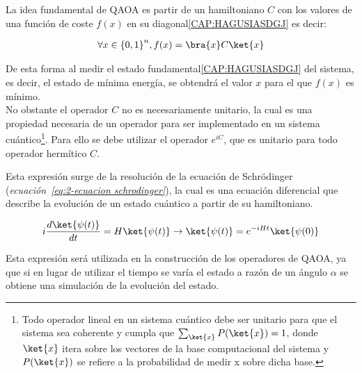 La idea fundamental de QAOA es partir de un hamiltoniano $C$ con los valores de una función de coste $f(x)$ en su diagonal\ref{CAP:HAGUSIASDGJ} es decir:

\begin{align}
  \forall{x \in {\{0, 1\}}^{n}}, f(x) = \bra{x}C\ket{x}
\end{align}

De esta forma al medir el estado fundamental\ref{CAP:HAGUSIASDGJ} del sistema, es decir, el estado de mínima energía, se obtendrá el valor $x$ para el que $f(x)$ es mínimo.
\\
No obstante el operador $C$ no es necesariamente unitario, la cual es una propiedad necesaria de un operador para ser implementado en un sistema cuántico\footnote{
  Todo operador lineal en un sistema cuántico debe ser unitario para que el sistema sea coherente y cumpla que $\sum_{\ket{x}} {P(\ket{x})} = 1$,
  donde $\ket{x}$ itera sobre los vectores de la base computacional del sistema y \(P(\ket{x})\) se refiere a la probabilidad de medir x sobre dicha base.}.
Para ello se debe utilizar el operador $e^{iC}$, que es unitario para todo operador hermítico $C$.

Esta expresión surge de la resolución de la ecuación de Schrödinger (\textit{ecuación~\ref{eq:2-ecuacion schrodinger}}), la cual es una ecuación diferencial que describe la evolución de un estado cuántico a partir de su hamiltoniano.

\begin{align}\label{eq:2-ecuacion schrodinger}
  i \frac{d\ket{\psi(t)}}{dt} = H \ket{\psi(t)} \rightarrow \ket{\psi(t)} = e^{-i H t}\ket{\psi(0)}
\end{align}

Esta expresión será utilizada en la construcción de los operadores de QAOA, ya que si en lugar de utilizar el tiempo se varía el estado a razón de un ángulo $\alpha$ se obtiene una simulación de la evolución del estado.

